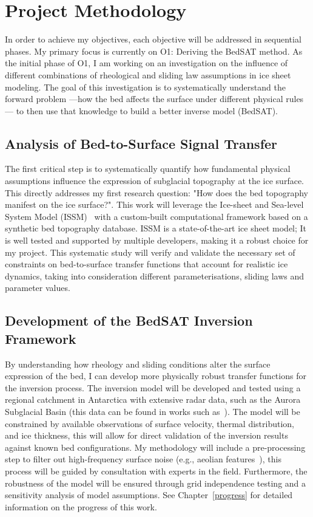 \chapter{Project Methodology}

In order to achieve my objectives, each objective will be addressed in sequential phases. My primary focus is currently on O1: Deriving the BedSAT method. As the initial phase of O1, I am working on an investigation on the influence of different combinations of rheological and sliding law assumptions in ice sheet modeling. The goal of this investigation is to systematically understand the forward problem —how the bed affects the surface under different physical rules— to then use that knowledge to build a better inverse model (BedSAT).

\section{Analysis of Bed-to-Surface Signal Transfer}\label{paper1}
The first critical step is to systematically quantify how fundamental physical assumptions influence the expression of subglacial topography at the ice surface.
This directly addresses my first research question: "How does the bed topography manifest on the ice surface?". This work will leverage the Ice-sheet and Sea-level System Model (ISSM)~\cite{Larour_2012} with a custom-built computational framework based on a synthetic bed topography database. ISSM is a state-of-the-art ice sheet model; It is well tested and supported by multiple developers, making it a robust choice for my project. This systematic study will verify and validate the necessary set of constraints on bed-to-surface transfer functions that account for realistic ice dynamics, taking into consideration different parameterisations, sliding laws and parameter values.

\section{Development of the BedSAT Inversion Framework}
By understanding how rheology and sliding conditions alter the surface expression of the bed, I can develop more physically robust transfer functions for the inversion process. The inversion model will be developed and tested using a regional catchment in Antarctica with extensive radar data, such as the Aurora Subglacial Basin (this data can be found in works such as~\cite{Young_2011}). The model will be constrained by available observations of surface velocity, thermal distribution, and ice thickness, this will allow for direct validation of the inversion results against known bed configurations. My methodology will include a pre-processing step to filter out high-frequency surface noise (e.g., aeolian features~\cite{Poizat_2024}), this process will be guided by consultation with experts in the field. Furthermore, the robustness of the model will be ensured through grid independence testing and a sensitivity analysis of model assumptions. See Chapter~\ref{progress} for detailed information on the progress of this work.

